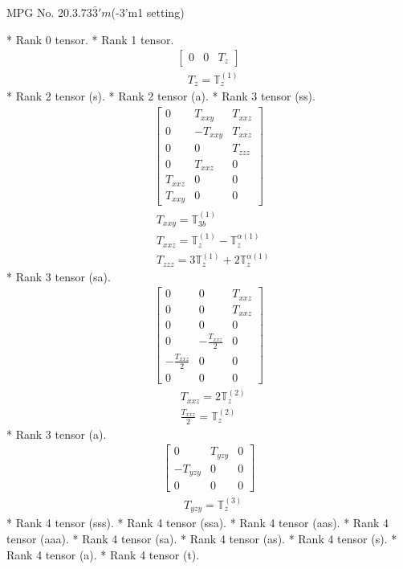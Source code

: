 \documentclass[fleqn,8pt,landscape]{jsarticle}
\begin{document}
\setcounter{MaxMatrixCols}{32}

\renewcommand{\tablename}{Table~}
\renewcommand{\figurename}{Figure~}
\begin{center}
\LARGE
MPG No. 20.3.73\quad$\bar{3}'m$\quad(-3'm1 setting)
\end{center}
* Rank 0 tensor.
* Rank 1 tensor.
\begin{align*}
\begin{bmatrix} 0 & 0 & T_{z} \end{bmatrix}
\end{align*}
\begin{align*}
& T_{z} = \mathbb{T}_{z}^{(1)}
\end{align*}
* Rank 2 tensor (s).
* Rank 2 tensor (a).
* Rank 3 tensor (ss).
\begin{align*}
\begin{bmatrix} 0 & T_{xxy} & T_{xxz} \\ 0 & - T_{xxy} & T_{xxz} \\ 0 & 0 & T_{zzz} \\ 0 & T_{xxz} & 0 \\ T_{xxz} & 0 & 0 \\ T_{xxy} & 0 & 0 \end{bmatrix}
\end{align*}
\begin{align*}
& T_{xxy} = \mathbb{T}_{3b}^{(1)} \\
& T_{xxz} = \mathbb{T}_{z}^{(1)} - \mathbb{T}_{z}^{\alpha(1)} \\
& T_{zzz} = 3 \mathbb{T}_{z}^{(1)} + 2 \mathbb{T}_{z}^{\alpha(1)}
\end{align*}
* Rank 3 tensor (sa).
\begin{align*}
\begin{bmatrix} 0 & 0 & T_{xxz} \\ 0 & 0 & T_{xxz} \\ 0 & 0 & 0 \\ 0 & - \frac{T_{xxz}}{2} & 0 \\ - \frac{T_{xxz}}{2} & 0 & 0 \\ 0 & 0 & 0 \end{bmatrix}
\end{align*}
\begin{align*}
& T_{xxz} = 2 \mathbb{T}_{z}^{(2)} \\
& \frac{T_{xxz}}{2} = \mathbb{T}_{z}^{(2)}
\end{align*}
* Rank 3 tensor (a).
\begin{align*}
\begin{bmatrix} 0 & T_{yzy} & 0 \\ - T_{yzy} & 0 & 0 \\ 0 & 0 & 0 \end{bmatrix}
\end{align*}
\begin{align*}
& T_{yzy} = \mathbb{T}_{z}^{(3)}
\end{align*}
* Rank 4 tensor (sss).
* Rank 4 tensor (ssa).
* Rank 4 tensor (aas).
* Rank 4 tensor (aaa).
* Rank 4 tensor (sa).
* Rank 4 tensor (as).
* Rank 4 tensor (s).
* Rank 4 tensor (a).
* Rank 4 tensor (t).
\end{document}
